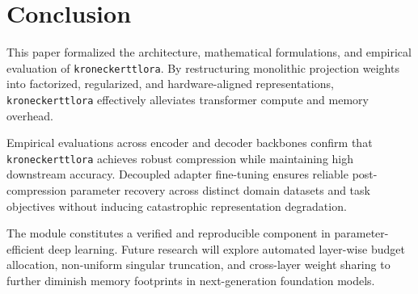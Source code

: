 \section{Conclusion}
This paper formalized the architecture, mathematical formulations, and empirical evaluation of \texttt{kroneckerttlora}. By restructuring monolithic projection weights into factorized, regularized, and hardware-aligned representations, \texttt{kroneckerttlora} effectively alleviates transformer compute and memory overhead.

Empirical evaluations across encoder and decoder backbones confirm that \texttt{kroneckerttlora} achieves robust compression while maintaining high downstream accuracy. Decoupled adapter fine-tuning ensures reliable post-compression parameter recovery across distinct domain datasets and task objectives without inducing catastrophic representation degradation.

The module constitutes a verified and reproducible component in parameter-efficient deep learning. Future research will explore automated layer-wise budget allocation, non-uniform singular truncation, and cross-layer weight sharing to further diminish memory footprints in next-generation foundation models.
